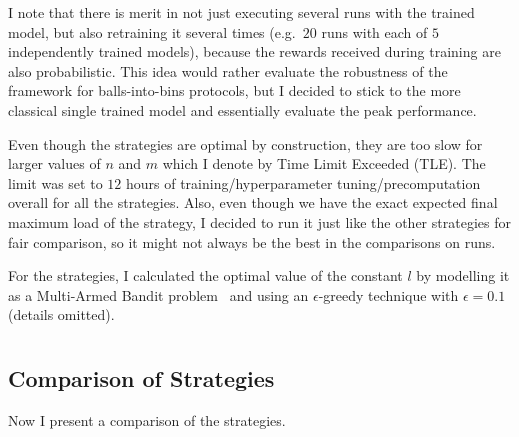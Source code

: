 I note that there is merit in not just executing several runs with the trained \DQL model, but also retraining it several times (e.g.\ $20$ runs with each of $5$ independently trained models), because the rewards received during training are also probabilistic. This idea would rather evaluate the robustness of the \DQL framework for balls-into-bins protocols, but I decided to stick to the more classical single trained model and essentially evaluate the peak performance.


Even though the \DP strategies are optimal by construction, they are too slow for larger values of $n$ and $m$ which I denote by Time Limit Exceeded (TLE). The limit was set to $12$ hours of training/hyperparameter tuning/precomputation overall for all the strategies. Also, even though we have the exact expected final maximum load of the \DP strategy, I decided to run it just like the other strategies for fair comparison, so it might not always be the best in the comparisons on \NumberofRuns runs.


For the \Threshold strategies, I calculated the optimal value of the constant $l$ by modelling it as a Multi-Armed Bandit problem~\cite{katehakis1987multiarmedbandit} and using an $\epsilon$-greedy technique with $\epsilon=0.1$ (details omitted).




\section{\TwoThinning}


\subsection{Comparison of Strategies}\label{two-thinning-comparison}

Now I present a comparison of the \TwoThinning strategies.


